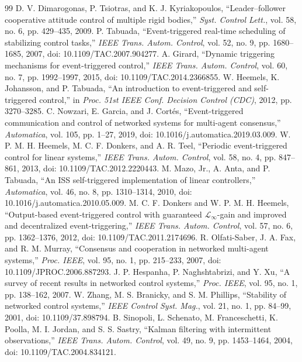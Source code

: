 \documentclass[journal]{IEEEtran}
\begin{document}
\begin{thebibliography}{99}
 D. V. Dimarogonas, P. Tsiotras, and K. J. Kyriakopoulos, ``Leader--follower cooperative attitude control of multiple rigid bodies,'' \emph{Syst. Control Lett.}, vol. 58, no. 6, pp. 429--435, 2009.
 P. Tabuada, ``Event-triggered real-time scheduling of stabilizing control tasks,'' \emph{IEEE Trans. Autom. Control}, vol. 52, no. 9, pp. 1680--1685, 2007, doi: 10.1109/TAC.2007.904277.
 A. Girard, ``Dynamic triggering mechanisms for event-triggered control,'' \emph{IEEE Trans. Autom. Control}, vol. 60, no. 7, pp. 1992--1997, 2015, doi: 10.1109/TAC.2014.2366855.
 W. Heemels, K. Johansson, and P. Tabuada, ``An introduction to event-triggered and self-triggered control,'' in \emph{Proc. 51st IEEE Conf. Decision Control (CDC)}, 2012, pp. 3270--3285.
 C. Nowzari, E. Garcia, and J. Cort\'es, ``Event-triggered communication and control of networked systems for multi-agent consensus,'' \emph{Automatica}, vol. 105, pp. 1--27, 2019, doi: 10.1016/j.automatica.2019.03.009.
 W. P. M. H. Heemels, M. C. F. Donkers, and A. R. Teel, ``Periodic event-triggered control for linear systems,'' \emph{IEEE Trans. Autom. Control}, vol. 58, no. 4, pp. 847--861, 2013, doi: 10.1109/TAC.2012.2220443.
 M. Mazo, Jr., A. Anta, and P. Tabuada, ``An ISS self-triggered implementation of linear controllers,'' \emph{Automatica}, vol. 46, no. 8, pp. 1310--1314, 2010, doi: 10.1016/j.automatica.2010.05.009.
 M. C. F. Donkers and W. P. M. H. Heemels, ``Output-based event-triggered control with guaranteed $\mathcal{L}_\infty$-gain and improved and decentralized event-triggering,'' \emph{IEEE Trans. Autom. Control}, vol. 57, no. 6, pp. 1362--1376, 2012, doi: 10.1109/TAC.2011.2174696.
 R. Olfati-Saber, J. A. Fax, and R. M. Murray, ``Consensus and cooperation in networked multi-agent systems,'' \emph{Proc. IEEE}, vol. 95, no. 1, pp. 215--233, 2007, doi: 10.1109/JPROC.2006.887293.
 J. P. Hespanha, P. Naghshtabrizi, and Y. Xu, ``A survey of recent results in networked control systems,'' \emph{Proc. IEEE}, vol. 95, no. 1, pp. 138--162, 2007.
 W. Zhang, M. S. Branicky, and S. M. Phillips, ``Stability of networked control systems,'' \emph{IEEE Control Syst. Mag.}, vol. 21, no. 1, pp. 84--99, 2001, doi: 10.1109/37.898794.
 B. Sinopoli, L. Schenato, M. Franceschetti, K. Poolla, M. I. Jordan, and S. S. Sastry, ``Kalman filtering with intermittent observations,'' \emph{IEEE Trans. Autom. Control}, vol. 49, no. 9, pp. 1453--1464, 2004, doi: 10.1109/TAC.2004.834121.

\end{thebibliography}
\end{document}
